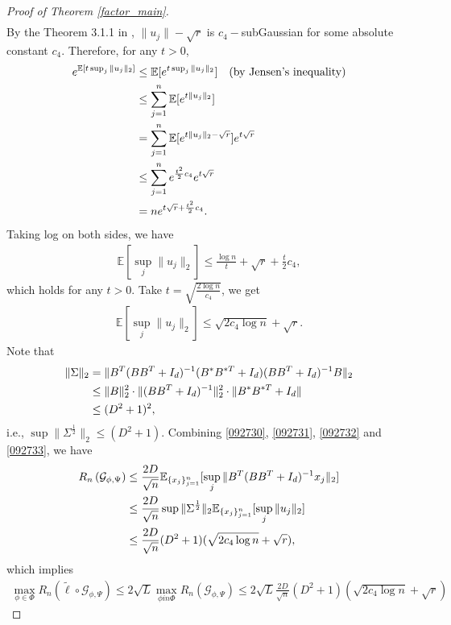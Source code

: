 \begin{proof}[Proof of Theorem \ref{factor_main}]
\begin{align}
\end{align}
By the Theorem 3.1.1 in \cite{vershynin2018high}, $\|u_{j}\|-\sqrt{r}$ is $c_{4}-$subGaussian for some absolute constant $c_{4}$. Therefore, for any $t>0$,
\begin{align}
e^{\mathbb{E}[t \sup_{j}\|u_{j}\|_{2}]} &\leq \mathbb{E} [e^{t \sup_{j}\|u_{j}\|_{2}}] \quad \text{(by Jensen's inequality)}\notag \\ 
& \leq \sum_{j=1}^{n} \mathbb{E} [e^{t \|u_{j}\|_{2}}] \notag \\
& = \sum_{j=1}^{n} \mathbb{E} [e^{t \|u_{j}\|_{2}-\sqrt{r}}]e^{t\sqrt{r}} \notag \\
& \leq \sum_{j=1}^{n} e^{\frac{t^{2}}{2}c_{4}}e^{t\sqrt{r}} \notag \\
&= n e^{t\sqrt{r}+\frac{t^{2}}{2}c_{4}}.
\end{align}
Taking log on both sides, we have
\begin{align}
\mathbb{E}[\sup_{j}\|u_{j}\|_{2}]    \leq \frac{\log n}{t} + \sqrt{r} + \frac{t}{2}c_{4},
\end{align}
which holds for any $t>0$. Take $t=\sqrt{\frac{2 \log n}{c_{4}}}$, we get
\begin{align} \label{092732}
\mathbb{E}[\sup_{j}\|u_{j}\|_{2}]    \leq \sqrt{2c_{4} \log n} + \sqrt{r}.    
\end{align}
Note that
\begin{align}\label{092733}
\|\Sigma\|_{2}&=\|B^{T} (BB^{T}+I_{d})^{-1}  (B^{*}B^{* T}+ I_{d}) (BB^{T}+I_{d})^{-1} B\|_{2} \notag \\
& \leq \|B\|_{2}^{2} \cdot \|(BB^{T}+I_{d})^{-1}\|_{2}^{2} \cdot \|B^{*}B^{* T}+ I_{d}\| \notag \\
& \leq (D^{2} +1)^{2},
\end{align}
i.e., $\sup \|\Sigma^{\frac{1}{2}}\|_{2} \leq (D^{2} +1)$.
Combining \eqref{092730}, \eqref{092731}, \eqref{092732} and \eqref{092733}, we have
\begin{align}
R_n\left(\mathcal{G}_{\phi, \Psi}\right) &\leq \frac{2D}{\sqrt{n}} \mathbb{E}_{\{x_{j}\}_{j=1}^{n}} [ \sup_{j} \|B^{T} (BB^{T}+I_{d})^{-1} x_{j}\|_{2}] \notag    \\
&\leq \frac{2D}{\sqrt{n}} \sup \|\Sigma^{\frac{1}{2}}\|_{2}\mathbb{E}_{\{x_{j}\}_{j=1}^{n}} [  \sup_{j}  \| u_{j}\|_{2}] \notag \\
& \leq \frac{2D}{\sqrt{n}}  (D^{2} +1) (\sqrt{2c_{4} \log n} + \sqrt{r}) ,
\end{align}
which implies
\begin{align} \label{R_bound}
\max_{\phi \in \Phi}R_n\left(\tilde{\ell} \circ \mathcal{G}_{\phi, \Psi}\right) \leq 2\sqrt{L} \max_{\phi in \Phi} R_n\left(\mathcal{G}_{\phi, \Psi}\right) \leq 2\sqrt{L}\frac{2D}{\sqrt{n}}  (D^{2} +1) (\sqrt{2c_{4} \log n} + \sqrt{r})

\end{align}
\end{proof}
